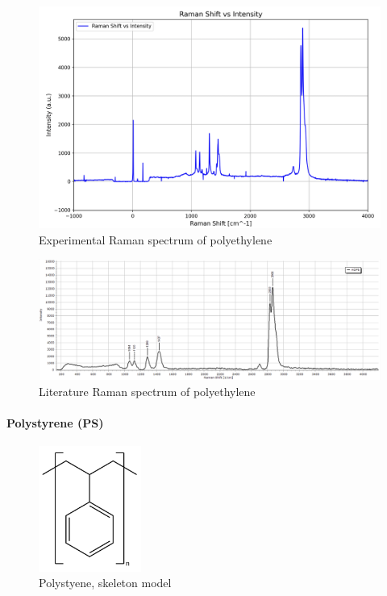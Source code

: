     

    \newpage

    \begin{figure}[h]
        \centering
        \includegraphics[width=\textwidth]{images/raman_spectra/raman_shift_polyethyleneh.png}
        \caption{Experimental Raman spectrum of polyethylene}
        \label{fig:pe_x}
    \end{figure}

    \begin{figure}[h]
        \centering
        \includegraphics[width=\textwidth]{images/lit_raman/HDPE.png}
        \caption{Literature Raman spectrum of polyethylene \cite{spectrap}}
        \label{fig:pe_l}
    \end{figure}

    \newpage

    \paragraph{Polystyrene (PS)}
    
    \begin{figure} %
        \centering
        \vspace{-20pt}
        \includegraphics[width=0.3\textwidth]{images/raman_spectra/ps_i.png}
        \caption{Polystyene, skeleton model}
        \label{fig:ps_i}
    \end{figure}


